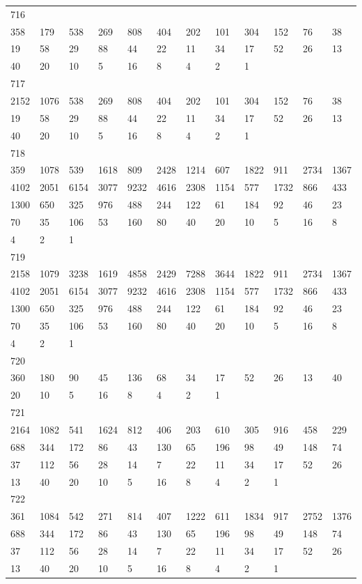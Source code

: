 \begin{longtable}{llllllllllll}
716&&&&&&&&&&&\\
358& 179& 538& 269& 808& 404& 202& 101& 304& 152& 76& 38\\
19& 58& 29& 88& 44& 22& 11& 34& 17& 52& 26& 13\\
40& 20& 10& 5& 16& 8& 4& 2& 1& \\

717&&&&&&&&&&&\\
2152& 1076& 538& 269& 808& 404& 202& 101& 304& 152& 76& 38\\
19& 58& 29& 88& 44& 22& 11& 34& 17& 52& 26& 13\\
40& 20& 10& 5& 16& 8& 4& 2& 1& \\

718&&&&&&&&&&&\\
359& 1078& 539& 1618& 809& 2428& 1214& 607& 1822& 911& 2734& 1367\\
4102& 2051& 6154& 3077& 9232& 4616& 2308& 1154& 577& 1732& 866& 433\\
1300& 650& 325& 976& 488& 244& 122& 61& 184& 92& 46& 23\\
70& 35& 106& 53& 160& 80& 40& 20& 10& 5& 16& 8\\
4& 2& 1& \\

719&&&&&&&&&&&\\
2158& 1079& 3238& 1619& 4858& 2429& 7288& 3644& 1822& 911& 2734& 1367\\
4102& 2051& 6154& 3077& 9232& 4616& 2308& 1154& 577& 1732& 866& 433\\
1300& 650& 325& 976& 488& 244& 122& 61& 184& 92& 46& 23\\
70& 35& 106& 53& 160& 80& 40& 20& 10& 5& 16& 8\\
4& 2& 1& \\

720&&&&&&&&&&&\\
360& 180& 90& 45& 136& 68& 34& 17& 52& 26& 13& 40\\
20& 10& 5& 16& 8& 4& 2& 1& \\

721&&&&&&&&&&&\\
2164& 1082& 541& 1624& 812& 406& 203& 610& 305& 916& 458& 229\\
688& 344& 172& 86& 43& 130& 65& 196& 98& 49& 148& 74\\
37& 112& 56& 28& 14& 7& 22& 11& 34& 17& 52& 26\\
13& 40& 20& 10& 5& 16& 8& 4& 2& 1& \\

722&&&&&&&&&&&\\
361& 1084& 542& 271& 814& 407& 1222& 611& 1834& 917& 2752& 1376\\
688& 344& 172& 86& 43& 130& 65& 196& 98& 49& 148& 74\\
37& 112& 56& 28& 14& 7& 22& 11& 34& 17& 52& 26\\
13& 40& 20& 10& 5& 16& 8& 4& 2& 1& \\


\end{longtable}
